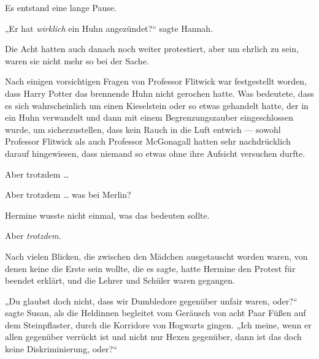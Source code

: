 Es entstand eine lange Pause.

„Er hat \emph{wirklich} ein Huhn angezündet?“ sagte Hannah.

\later

Die Acht hatten auch danach noch weiter protestiert, aber um ehrlich zu sein, waren sie nicht mehr so bei der Sache.

Nach einigen vorsichtigen Fragen von Professor Flitwick war festgestellt worden, dass Harry Potter das brennende Huhn nicht gerochen hatte. Was bedeutete, dass es sich wahrscheinlich um einen Kieselstein oder so etwas gehandelt hatte, der in ein Huhn verwandelt und dann mit einem Begrenzungszauber eingeschlossen wurde, um sicherzustellen, dass kein Rauch in die Luft entwich — sowohl Professor Flitwick als auch Professor McGonagall hatten sehr nachdrücklich darauf hingewiesen, dass niemand so etwas ohne ihre Aufsicht versuchen durfte.

Aber trotzdem …

Aber trotzdem … was bei Merlin?

Hermine wusste nicht einmal, was das bedeuten sollte.

Aber \emph{trotzdem}.

Nach vielen Blicken, die zwischen den Mädchen ausgetauscht worden waren, von denen keine die Erste sein wollte, die es sagte, hatte Hermine den Protest für beendet erklärt, und die Lehrer und Schüler waren gegangen.

„Du glaubst doch nicht, dass wir Dumbledore gegenüber unfair waren, oder?“ sagte Susan, als die Heldinnen begleitet vom Geräusch von acht Paar Füßen auf dem Steinpflaster, durch die Korridore von Hogwarts gingen.
„Ich meine, wenn er allen gegenüber verrückt ist und nicht nur Hexen gegenüber, dann ist das doch keine Diskriminierung, oder?“

